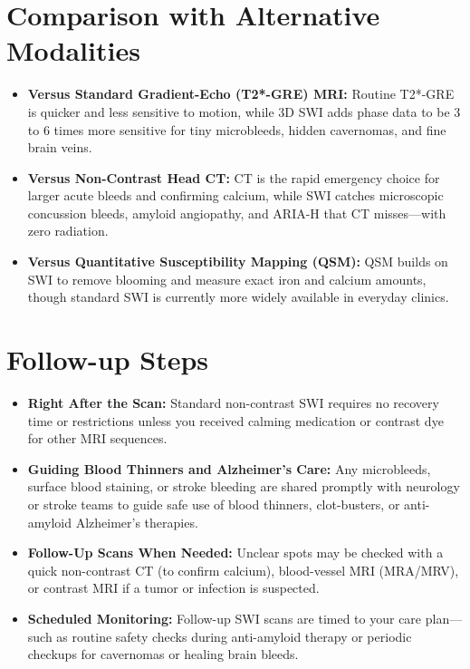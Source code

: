 \section{Comparison with Alternative Modalities}

\begin{itemize}
    \item \textbf{Versus Standard Gradient-Echo (T2*-GRE) MRI:} Routine T2*-GRE is quicker and less sensitive to motion, while 3D SWI adds phase data to be 3 to 6 times more sensitive for tiny microbleeds, hidden cavernomas, and fine brain veins.
    \item \textbf{Versus Non-Contrast Head CT:} CT is the rapid emergency choice for larger acute bleeds and confirming calcium, while SWI catches microscopic concussion bleeds, amyloid angiopathy, and ARIA-H that CT misses---with zero radiation.
    \item \textbf{Versus Quantitative Susceptibility Mapping (QSM):} QSM builds on SWI to remove blooming and measure exact iron and calcium amounts, though standard SWI is currently more widely available in everyday clinics.
\end{itemize}

\section{Follow-up Steps}

\begin{itemize}
    \item \textbf{Right After the Scan:} Standard non-contrast SWI requires no recovery time or restrictions unless you received calming medication or contrast dye for other MRI sequences.
    \item \textbf{Guiding Blood Thinners and Alzheimer's Care:} Any microbleeds, surface blood staining, or stroke bleeding are shared promptly with neurology or stroke teams to guide safe use of blood thinners, clot-busters, or anti-amyloid Alzheimer's therapies.
    \item \textbf{Follow-Up Scans When Needed:} Unclear spots may be checked with a quick non-contrast CT (to confirm calcium), blood-vessel MRI (MRA/MRV), or contrast MRI if a tumor or infection is suspected.
    \item \textbf{Scheduled Monitoring:} Follow-up SWI scans are timed to your care plan---such as routine safety checks during anti-amyloid therapy or periodic checkups for cavernomas or healing brain bleeds.
\end{itemize}

